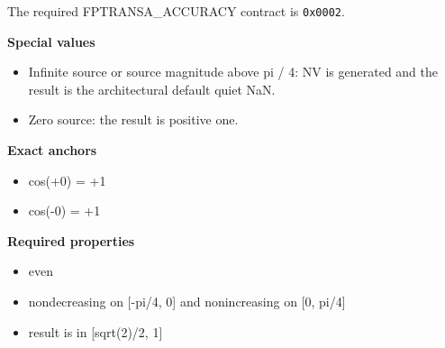 The required FPTRANSA\_ACCURACY contract is \texttt{0x0002}.

\textbf{Special values}\par
\begin{itemize}
\item Infinite source or source magnitude above pi / 4: NV is generated and the result is the architectural default quiet NaN.
\item Zero source: the result is positive one.
\end{itemize}

\textbf{Exact anchors}\par
\begin{itemize}
\item cos(+0) = +1
\item cos(-0) = +1
\end{itemize}

\textbf{Required properties}\par
\begin{itemize}
\item even
\item nondecreasing on [-pi/4, 0] and nonincreasing on [0, pi/4]
\item result is in [sqrt(2)/2, 1]
\end{itemize}

